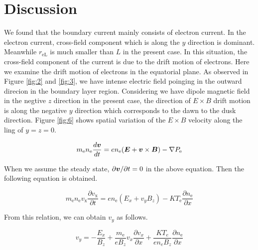 \documentclass{EPS}
\newcommand{\bvec}[1]{\mbox{\boldmath $#1$}}
\begin{document}
\section{Discussion}

We found that the boundary current mainly consists of electron current. 
In the electron current, cross-field component which is along the $y$ direction is dominant. 
Meanwhile $r_\mathrm{eL}$ is much smaller than $L$ in the present case. 
In this situation, the cross-field component of the current is due to the drift motion of electrons.
Here we examine the drift motion of electrons in the equatorial plane. 
As observed in Figure \ref{fig:2} and \ref{fig:3}, we have intense electric field poinging in the outward direcion
in the boundary layer region. 
Considering we have dipole magnetic field in the negtive $z$ direction in the present case, 
the direction of $E \times B$ drift motion is along the negative $y$ direction which corresponds to the 
dawn to the dusk direction.  
Figure \ref{fig:6} shows spatial variation of the $E \times B$ velocity along the ling of $y=z=0$. 
 
\begin{linenomath}
 \begin{equation}
  m_\mathrm{e} n_\mathrm{e} \frac{d \bvec{v}}{dt}
    = en_\mathrm{e}(\bvec{E} + \bvec{v} \times \bvec{B}) - \nabla P_\mathrm{e}
 \end{equation}
\end{linenomath}

When we assume the steady state, $\partial{\bvec{v}}/\partial{t} = 0 $ in the above equation. Then 
the following equation is obtained.

\begin{linenomath}
 \begin{equation}
  m_\mathrm{e} n_\mathrm{e} v_\mathrm{x} \frac{\partial v_\mathrm{x}}{\partial t}
    = en_\mathrm{e} (E_x + v_y B_z) -  K T_\mathrm{e} \frac{\partial n_\mathrm{e}} {\partial x}
 \end{equation}
\end{linenomath}
From this relation, we can obtain $v_y$ as follows.


\begin{linenomath}
 \begin{equation}
  v_{y} = 
   -\frac{E_x}{B_z} + \frac {m_\mathrm{e}}{eB_z}v_x\frac{\partial v_x}{\partial x}
   +\frac{KT_e}{en_e B_z} \frac{\partial n_\mathrm{e}} {\partial x}
 \end{equation}
\end{linenomath}
\end{document}
